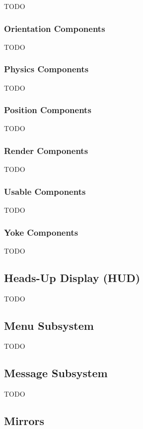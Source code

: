 TODO

\subsubsection{Orientation Components}

TODO

\subsubsection{Physics Components}

TODO

\subsubsection{Position Components}

TODO

\subsubsection{Render Components}

TODO

\subsubsection{Usable Components}

TODO

\subsubsection{Yoke Components}

TODO

\subsection{Heads-Up Display (HUD)}

TODO

\subsection{Menu Subsystem}

TODO

\subsection{Message Subsystem}

TODO

\subsection{Mirrors}

